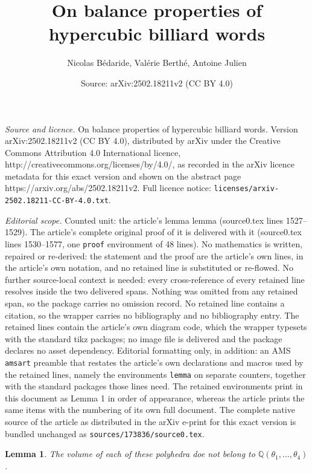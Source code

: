 \documentclass[10pt,a4paper]{amsart}
\title{On balance properties of hypercubic billiard words}
\author{Nicolas B\'edaride, Val\'erie Berth\'e, Antoine Julien}
\date{Source: arXiv:2502.18211v2 (CC BY 4.0)}
\newtheorem{lemma}{Lemma}
\begin{document}
\maketitle

\noindent\emph{Source and licence.} On balance properties of hypercubic billiard words. Version arXiv:2502.18211v2 (CC BY 4.0), distributed by arXiv under the Creative Commons Attribution 4.0 International licence, http://creativecommons.org/licenses/by/4.0/, as recorded in the arXiv licence metadata for this exact version and shown on the abstract page https://arxiv.org/abs/2502.18211v2. Full licence notice: \texttt{licenses/arxiv-2502.18211-CC-BY-4.0.txt}.\par\smallskip

\noindent\textit{Editorial scope.} Counted unit: the article's lemma lemma (source0.tex lines 1527--1529). The article's complete original proof of it is delivered with it (source0.tex lines 1530--1577, one \texttt{proof} environment of 48 lines). No mathematics is written, repaired or re-derived: the statement and the proof are the article's own lines, in the article's own notation, and no retained line is substituted or re-flowed.  No further source-local context is needed: every cross-reference of every retained line resolves inside the two delivered spans.  Nothing was omitted from any retained span, so the package carries no omission record.  No retained line contains a citation, so the wrapper carries no bibliography and no bibliography entry.  The retained lines contain the article's own diagram code, which the wrapper typesets with the standard tikz packages; no image file is delivered and the package declares no asset dependency.  Editorial formatting only, in addition: an AMS \texttt{amsart} preamble that restates the article's own declarations and macros used by the retained lines, namely the environments \texttt{lemma} on separate counters, together with the standard packages those lines need.  The retained environments print in this document as Lemma 1 in order of appearance, whereas the article prints the same items with the numbering of its own full document.  The complete native source of the article as distributed in the arXiv e-print for this exact version is bundled unchanged as \texttt{sources/173836/source0.tex}.
\begin{lemma}
The volume of each of these polyhedra doe not belong to $\mathbb Q(\theta_1,\dots, \theta_4)$.
\end{lemma}
\end{document}
